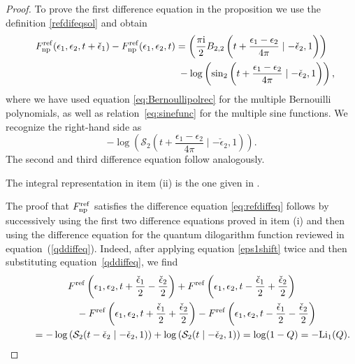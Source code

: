 \documentclass[pdftex]{sigma}
\numberwithin{equation}{section}
\begin{document}
\begin{proof}
To prove the first difference equation in the proposition we use the definition \eqref{refdifeqsol} and obtain
\begin{gather*}
 F_{{\rm np}}^{{\rm ref}}(\epsilon_1,\epsilon_2,t+\check{\epsilon}_1)-F_{{\rm np}}^{{\rm ref}}(\epsilon_1,\epsilon_2,t)= \left(\frac{\pi \mathrm{i}}{2} B_{2,2}\left(t+\frac{\epsilon_1-\epsilon_2}{4\pi}\mid {-}\check{\epsilon}_2,1 \right)\right) \\
\hphantom{F_{{\rm np}}^{{\rm ref}}(\epsilon_1,\epsilon_2,t+\check{\epsilon}_1)-F_{{\rm np}}^{{\rm ref}}(\epsilon_1,\epsilon_2,t)=}{}
 - \log\left(\sin_2\left(t+\frac{\epsilon_1-\epsilon_2}{4\pi} \mid {-}\check{\epsilon}_2,1\right)\right),
 \end{gather*}
where we have used equation \eqref{eq:Bernoullipolrec} for the multiple Bernouilli polynomials, as well as relation~\eqref{eq:sinefunc} for the multiple sine functions. We recognize the right-hand side as
\begin{equation*}
 - \log\left( \mathcal{S}_2\left(t+\frac{\epsilon_1-\epsilon_2}{4\pi}\mid {-}\check{\epsilon}_2,1\right) \right).
\end{equation*}
The second and third difference equation follow analogously.

The integral representation in item (ii) is the one given in \cite[Proposition~2]{Narukawa}.

The proof that $F^{{\rm ref}}_{{\rm np}}$ satisfies the difference equation \eqref{eq:refdiffeq} follows by successively using the first two difference equations proved in item (i) and then using the difference equation for the quantum dilogarithm function reviewed in equation~(\ref{qddiffeq}). Indeed, after applying equation \eqref{eps1shift} twice and then substituting equation~\eqref{qddiffeq}, we find
\begin{gather*}
 F^{{\rm ref}} \left(\epsilon_1,\epsilon_2,t+\frac{\check{\epsilon}_1}{2}-\frac{\check{\epsilon}_2}{2}\right) + F^{{\rm ref}}\left(\epsilon_1,\epsilon_2,t-\frac{\check{\epsilon}_1}{2}+\frac{\check{\epsilon}_2}{2} \right) \\
\qquad\quad {}-F^{{\rm ref}}\left(\epsilon_1,\epsilon_2,t+\frac{\check{\epsilon}_1}{2}+\frac{\check{\epsilon}_2}{2}\right)-F^{{\rm ref}}\left(\epsilon_1,\epsilon_2,t-\frac{\check{\epsilon}_1}{2}-\frac{\check{\epsilon}_2}{2} \right)\\
 \qquad{} =-\log\left(\mathcal{S}_2(t-\check\epsilon_2\mid {-}\check\epsilon_2,1)\right) +\log\left(\mathcal{S}_2(t\mid {-}\check\epsilon_2,1)\right)
 =\log(1-Q)=-\mathrm{Li}_1(Q).
 \end{gather*}


\end{proof}
\end{document}
